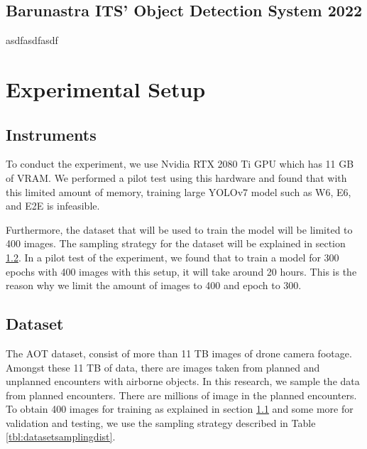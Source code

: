 \documentclass[conference]{IEEEtran}
\begin{document}
\subsection{Barunastra ITS' Object Detection System 2022}
asdfasdfasdf

\section{Experimental Setup}

\subsection{Instruments}
\label{section:instruments}
To conduct the experiment, we use Nvidia RTX 2080 Ti GPU which has 11 GB of VRAM.
We performed a pilot test using this hardware and found that
with this limited amount of memory, training large YOLOv7 model such as W6, E6, and E2E
is infeasible. 


Furthermore, the dataset that will be used to train the model will be limited to 400 images.
The sampling strategy for the dataset will be explained in section \ref{section:dataset}.
In a pilot test of the experiment, we found that to train a model for 300 epochs with 400 images
with this setup, it will take around 20 hours. This is the reason why we limit the 
amount of images to 400 and epoch to 300.

\subsection{Dataset}
\label{section:dataset}
The AOT dataset, consist of more than 11 TB images of drone camera footage.
Amongst these 11 TB of data, there are images taken from planned and unplanned encounters with
airborne objects. In this research, we sample the data from planned encounters.
There are millions of image in the planned encounters. To obtain 400 images
for training as explained in section \ref{section:instruments}
and some more for validation and testing, we use the sampling strategy
described in Table \ref{tbl:datasetsamplingdist}.
\end{document}
